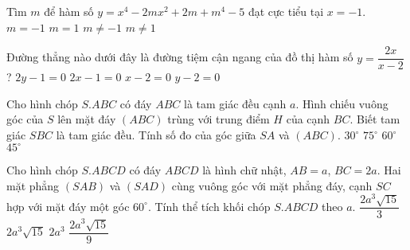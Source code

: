 \begin{ex}%
Tìm $m$ để hàm số $y=x^4-2mx^2+2m+m^4-5$ đạt cực tiểu tại $x=-1$.
	\choice
	{$m=-1$}
	{\True $m=1$}
	{$m\ne -1$}
	{$m\ne 1$}
\end{ex}
\begin{ex}%
Đường thẳng nào dưới đây là đường tiệm cận ngang của đồ thị hàm số $y=\dfrac{2x}{x-2}$?
	\choice
	{$2y-1=0$}
	{$2x-1=0$}
	{$x-2=0$}
	{\True $y-2=0$}
\end{ex}
\begin{ex}%
Cho hình chóp $S.ABC$ có đáy $ABC$ là tam giác đều cạnh $a$. Hình chiếu vuông góc của $S$ lên mặt đáy $(ABC)$ trùng với trung điểm $H$ của cạnh $BC$. Biết tam giác $SBC$ là tam giác đều. Tính số đo của góc giữa $SA$ và $(ABC)$.
	\choice
	{$30^\circ$}
	{$75^\circ$}
	{\True $60^\circ$}
	{$45^\circ$}
\end{ex}
\begin{ex}%
Cho hình chóp $S.ABCD$ có đáy $ABCD$ là hình chữ nhật, $AB=a$, $BC=2a$. Hai mặt phẳng $(SAB)$ và $(SAD)$ cùng vuông góc với mặt phẳng đáy, cạnh $SC$ hợp với mặt đáy một góc $60^\circ$. Tính thể tích khối chóp $S.ABCD$ theo $a$.
	\choice
	{\True $\dfrac{2a^3\sqrt{15}}{3}$}
	{$2a^3\sqrt{15}$}
	{$2a^3$}
	{$\dfrac{2a^3\sqrt{15}}{9}$}
\end{ex}
\begin{ex}%
{
}
\end{ex}
